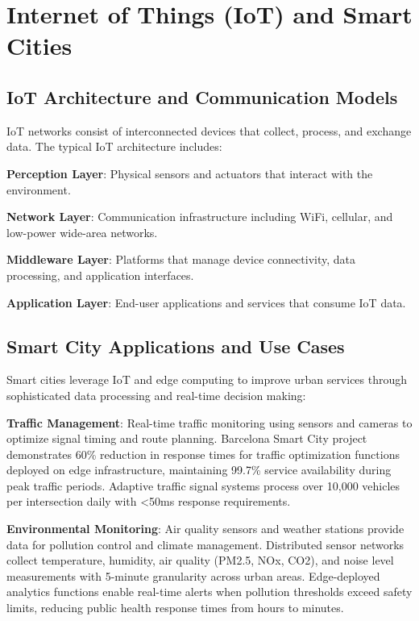\section{Internet of Things (IoT) and Smart Cities}

\subsection{IoT Architecture and Communication Models}

IoT networks consist of interconnected devices that collect, process, and exchange data. The typical IoT architecture includes:

\textbf{Perception Layer}: Physical sensors and actuators that interact with the environment.

\textbf{Network Layer}: Communication infrastructure including WiFi, cellular, and low-power wide-area networks.

\textbf{Middleware Layer}: Platforms that manage device connectivity, data processing, and application interfaces.

\textbf{Application Layer}: End-user applications and services that consume IoT data.

\subsection{Smart City Applications and Use Cases}

Smart cities leverage IoT and edge computing to improve urban services through sophisticated data processing and real-time decision making:

\textbf{Traffic Management}: Real-time traffic monitoring using sensors and cameras to optimize signal timing and route planning. Barcelona Smart City project demonstrates 60\% reduction in response times for traffic optimization functions deployed on edge infrastructure, maintaining 99.7\% service availability during peak traffic periods. Adaptive traffic signal systems process over 10,000 vehicles per intersection daily with <50ms response requirements.

\textbf{Environmental Monitoring}: Air quality sensors and weather stations provide data for pollution control and climate management. Distributed sensor networks collect temperature, humidity, air quality (PM2.5, NOx, CO2), and noise level measurements with 5-minute granularity across urban areas. Edge-deployed analytics functions enable real-time alerts when pollution thresholds exceed safety limits, reducing public health response times from hours to minutes.

